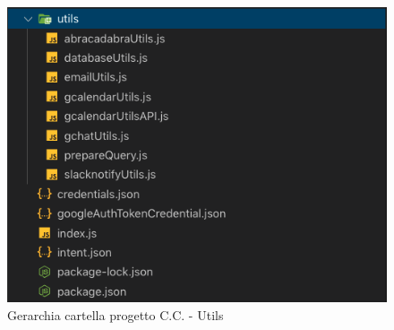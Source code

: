 \begin{figure}[H]
	\includegraphics[width=13cm]{immagini/skill-folder3.png}
	\caption{\label{fig:gerarchia_cartella_cc3}Gerarchia cartella progetto C.C. - Utils}
\end{figure}

